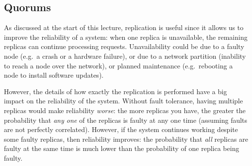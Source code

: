 \subsection{Quorums}\label{sec:quorums}

As discussed at the start of this lecture, replication is useful since it allows us to improve the reliability of a system: when one replica is unavailable, the remaining replicas can continue processing requests.
Unavailability could be due to a faulty node (e.g.\ a crash or a hardware failure), or due to a network partition (inability to reach a node over the network), or planned maintenance (e.g.\ rebooting a node to install software updates).

However, the details of how exactly the replication is performed have a big impact on the reliability of the system.
Without fault tolerance, having multiple replicas would make reliability \emph{worse}: the more replicas you have, the greater the probability that \emph{any one} of the replicas is faulty at any one time (assuming faults are not perfectly correlated).
However, if the system continues working despite some faulty replicas, then reliability improves: the probability that \emph{all} replicas are faulty at the same time is much lower than the probability of one replica being faulty.

